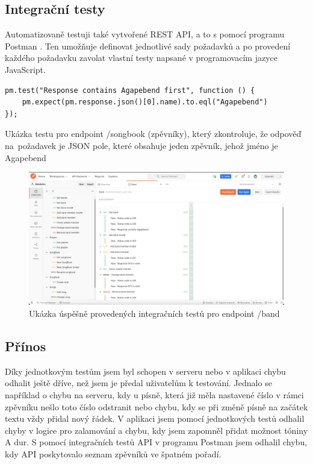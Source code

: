\subsection{Integrační testy}

Automatizovaně testuji také vytvořené REST API, a to s pomocí programu Postman \cite{postman}. Ten umožňuje definovat jednotlivé sady požadavků a po provedení každého požadavku zavolat vlastní testy napsané v programovacím jazyce JavaScript.

\begin{listing}[H]
\begin{verbatim}
pm.test("Response contains Agapebend first", function () {
    pm.expect(pm.response.json()[0].name).to.eql("Agapebend")
});
\end{verbatim}
\caption[Ukázka integračních testů v programu Postman]{Ukázka testu pro endpoint /songbook (zpěvníky), který zkontroluje, že odpověď na~požadavek je JSON pole, které obsahuje jeden zpěvník, jehož jméno je Agapebend}
\end{listing}

\begin{figure}[H]
    \includegraphics[width=\textwidth]{images/6-testovani/6-3-integracni-test-postman.png}
    \caption{Ukázka úspěšně provedených integračních testů pro endpoint /band}
\end{figure}

\subsection{Přínos}

Díky jednotkovým testům jsem byl schopen v serveru nebo v aplikaci chybu odhalit ještě dříve, než jsem je předal uživatelům k testování. Jednalo se například o chybu na serveru, kdy u písně, která již měla nastavené číslo v rámci zpěvníku nešlo toto číslo odstranit nebo chybu, kdy se při změně písně na začátek textu vždy přidal nový řádek. V aplikaci jsem pomocí jednotkových testů odhalil chyby v logice pro zalamování a chybu, kdy jsem zapomněl přidat možnost tóniny A dur. S pomocí integračních testů API v programu Postman jsem odhalil chybu, kdy API poskytovalo seznam zpěvníků ve špatném pořadí.

